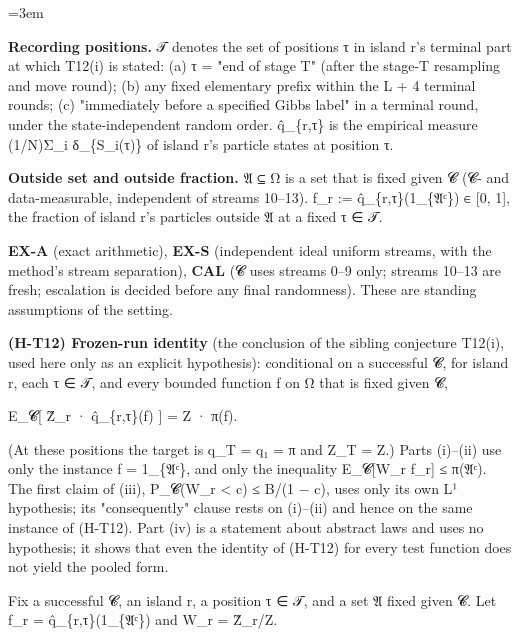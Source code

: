 \documentclass[11pt]{report}
\newenvironment{mdblock}{\begingroup\mdfont\raggedright\setlength{\parindent}{0pt}\setlength{\parskip}{0.55em}\emergencystretch=3em}{\par\endgroup}
\newcommand{\mdhead}[2]{\par\vspace{0.7em}\noindent{\bfseries\ifcase#1\or\large\or\normalsize\or\normalsize\or\small\or\small\or\small\fi #2}\par\nopagebreak\vspace{0.1em}}
\begin{document}
\begin{mdblock}
\begin{mdbul}
\item \textbf{Recording positions.} 𝒯 denotes the set of positions τ in island r's terminal part at which T12(i) is stated: (a) τ = "end of stage T" (after the stage-T resampling and move round); (b) any fixed elementary prefix within the L + 4 terminal rounds; (c) "immediately before a specified Gibbs label" in a terminal round, under the state-independent random order. q̂\_\{r,τ\} is the empirical measure (1/N)Σ\_i δ\_\{S\_i(τ)\} of island r's particle states at position τ.
\item \textbf{Outside set and outside fraction.} 𝔄 ⊆ Ω is a set that is fixed given 𝓒 (𝓒- and data-measurable, independent of streams 10–13). f\_r := q̂\_\{r,τ\}(1\_\{𝔄ᶜ\}) ∈ [0, 1], the fraction of island r's particles outside 𝔄 at a fixed τ ∈ 𝒯.
\end{mdbul}

\mdhead{2}{2. Hypotheses}

\begin{mdbul}
\item \textbf{EX-A} (exact arithmetic), \textbf{EX-S} (independent ideal uniform streams, with the method's stream separation), \textbf{CAL} (𝓒 uses streams 0–9 only; streams 10–13 are fresh; escalation is decided before any final randomness). These are standing assumptions of the setting.
\item \textbf{(H-T12) Frozen-run identity} (the conclusion of the sibling conjecture T12(i), used here only as an explicit hypothesis): conditional on a successful 𝓒, for island r, each τ ∈ 𝒯, and every bounded function f on Ω that is fixed given 𝓒,

E\_𝓒[ Ẑ\_r · q̂\_\{r,τ\}(f) ] = Z · π(f).

(At these positions the target is q\_T = q₁ = π and Z\_T = Z.) Parts (i)–(ii) use only the instance f = 1\_\{𝔄ᶜ\}, and only the inequality E\_𝓒[W\_r f\_r] ≤ π(𝔄ᶜ). The first claim of (iii), P\_𝓒(W\_r < c) ≤ B/(1 − c), uses only its own L¹ hypothesis; its "consequently" clause rests on (i)–(ii) and hence on the same instance of (H-T12). Part (iv) is a statement about abstract laws and uses no hypothesis; it shows that even the identity of (H-T12) for every test function does not yield the pooled form.
\end{mdbul}

\mdhead{2}{3. Conclusions}

Fix a successful 𝓒, an island r, a position τ ∈ 𝒯, and a set 𝔄 fixed given 𝓒. Let f\_r = q̂\_\{r,τ\}(1\_\{𝔄ᶜ\}) and W\_r = Ẑ\_r/Z.


\end{mdblock}
\end{document}
